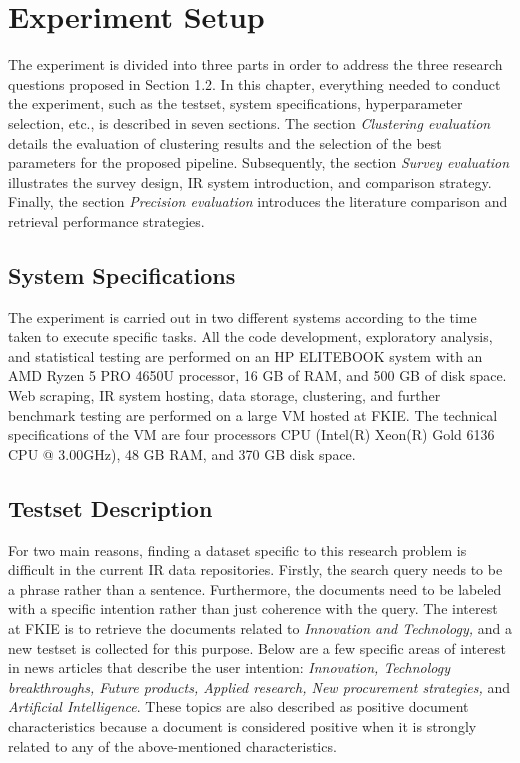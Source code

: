 
\chapter{Experiment Setup}

The experiment is divided into three parts in order to address the three research questions proposed in Section 1.2. In this chapter, everything needed to conduct the experiment, such as the testset, system specifications, hyperparameter selection, etc., is described in seven sections. The section \emph{Clustering evaluation} details the evaluation of clustering results and the selection of the best parameters for the proposed pipeline. Subsequently, the section \emph{Survey evaluation} illustrates the survey design, \ac{IR} system introduction, and comparison strategy. Finally, the section \emph{Precision evaluation} introduces the literature comparison and retrieval performance strategies.



	\section{System Specifications}

The experiment is carried out in two different systems according to the time taken to execute specific tasks. All the code development, exploratory analysis, and statistical testing are performed on an HP ELITEBOOK system with an AMD Ryzen 5 PRO 4650U processor, 16 GB of RAM, and 500 GB of disk space. Web scraping, \ac{IR} system hosting, data storage, clustering, and further benchmark testing are performed on a large \ac{VM} hosted at \ac{FKIE}. The technical specifications of the \ac{VM} are four processors CPU (Intel(R) Xeon(R) Gold 6136 CPU @ 3.00GHz), 48 GB RAM, and 370 GB disk space.
	
	
	\section{Testset Description}

For two main reasons, finding a dataset specific to this research problem is difficult in the current \ac{IR} data repositories. Firstly, the search query needs to be a phrase rather than a sentence. Furthermore, the documents need to be labeled with a specific intention rather than just coherence with the query. The interest at \ac{FKIE} is to retrieve the documents related to \emph{Innovation and Technology,} and a new testset is collected for this purpose. Below are a few specific areas of interest in news articles that describe the user intention: \emph{Innovation, Technology breakthroughs, Future products, Applied research, New procurement strategies,} and \emph{Artificial Intelligence}. These topics are also described as positive document characteristics because a document is considered positive when it is strongly related to any of the above-mentioned characteristics.



